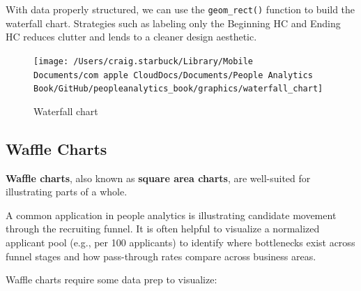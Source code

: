 \documentclass[
]{book}
\begin{document}
With data properly structured, we can use the \texttt{geom\_rect()} function to build the waterfall chart. Strategies such as labeling only the Beginning HC and Ending HC reduces clutter and lends to a cleaner design aesthetic.

\begin{figure}

{\centering \texttt{[image: /Users/craig.starbuck/Library/Mobile Documents/com~apple~CloudDocs/Documents/People Analytics Book/GitHub/peopleanalytics\_book/graphics/waterfall\_chart]} 

}

\caption{Waterfall chart}\label{fig:waterfl-chart}
\end{figure}

\hypertarget{waffle-charts}{%
\subsection{Waffle Charts}\label{waffle-charts}}

\textbf{Waffle charts}, also known as \textbf{square area charts}, are well-suited for illustrating parts of a whole.

A common application in people analytics is illustrating candidate movement through the recruiting funnel. It is often helpful to visualize a normalized applicant pool (e.g., per 100 applicants) to identify where bottlenecks exist across funnel stages and how pass-through rates compare across business areas.

Waffle charts require some data prep to visualize:
\end{document}
